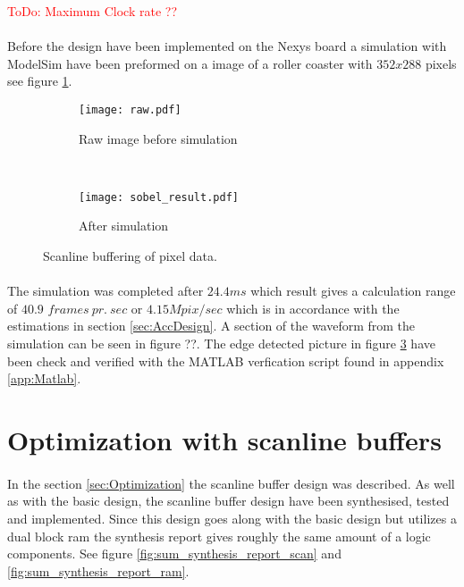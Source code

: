 \textcolor{red}{ToDo: Maximum Clock rate ??}

\paragraph*{}
Before the design have been implemented on the Nexys board a simulation with ModelSim have been preformed on a image of a roller coaster with $352x288$ pixels see figure \ref{fig:test_picture_raw}. 

\begin{figure}[H]
	\centering
	\begin{subfigure}[b]{0.4\textwidth}
		\texttt{[image: raw.pdf]}
		\caption{Raw image before simulation}
		\label{fig:test_picture_raw}
    \end{subfigure}%
        ~ %
    \begin{subfigure}[b]{0.4\textwidth}
    	\texttt{[image: sobel\_result.pdf]}
    	\caption{After simulation}
    	\label{fig:test_picture_sobel}
	\end{subfigure}
	\caption{Scanline buffering of pixel data.}
\end{figure}

\paragraph*{}
The simulation was completed after $24.4ms$ which result gives a calculation range of $40.9$ $frames~pr.~sec$ or $4.15Mpix/sec$ which is in accordance with the estimations in section \ref{sec:AccDesign}. A section of the waveform from the simulation can be seen in figure ??. The edge detected picture in figure \ref{fig:test_picture_sobel} have been check and verified with the MATLAB verfication script found in appendix \ref{app:Matlab}.   

\section{Optimization with scanline buffers}
\paragraph*{}
In the section \ref{sec:Optimization} the scanline buffer design was described. As well as with the basic design, the scanline buffer design have been synthesised, tested and implemented. Since this design goes along with the basic design but utilizes a dual block ram the synthesis report gives roughly the same amount of a logic components. See figure \ref{fig:sum_synthesis_report_scan} and \ref{fig:sum_synthesis_report_ram}.   
    
